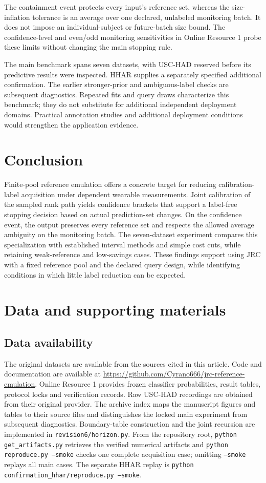 \documentclass[pdflatex,sn-basic,Numbered,iicol]{sn-jnl}
\begin{document}
The containment event protects every input's reference set, whereas the size-inflation tolerance is an average over one declared, unlabeled monitoring batch. It does not impose an individual-subject or future-batch size bound. The confidence-level and even/odd monitoring sensitivities in Online Resource 1 probe these limits without changing the main stopping rule.

The main benchmark spans seven datasets, with USC-HAD reserved before its predictive results were inspected. HHAR supplies a separately specified additional confirmation. The earlier stronger-prior and ambiguous-label checks are subsequent diagnostics. Repeated fits and query draws characterize this benchmark; they do not substitute for additional independent deployment domains. Practical annotation studies and additional deployment conditions would strengthen the application evidence.

\section{Conclusion}
Finite-pool reference emulation offers a concrete target for reducing calibration-label acquisition under dependent wearable measurements. Joint calibration of the sampled rank path yields confidence brackets that support a label-free stopping decision based on actual prediction-set changes. On the confidence event, the output preserves every reference set and respects the allowed average ambiguity on the monitoring batch. The seven-dataset experiment compares this specialization with established interval methods and simple cost cuts, while retaining weak-reference and low-savings cases. These findings support using JRC with a fixed reference pool and the declared query design, while identifying conditions in which little label reduction can be expected.


\backmatter
\section*{Data and supporting materials}
\subsection*{Data availability}
The original datasets are available from the sources cited in this article. Code and documentation are available at \url{https://github.com/Cyrano666/jrc-reference-emulation}. Online Resource 1 provides frozen classifier probabilities, result tables, protocol locks and verification records. Raw USC-HAD recordings are obtained from their original provider. The archive index maps the manuscript figures and tables to their source files and distinguishes the locked main experiment from subsequent diagnostics. Boundary-table construction and the joint recursion are implemented in \texttt{revision6/horizon.py}. From the repository root, \texttt{python get\_artifacts.py} retrieves the verified numerical artifacts and \texttt{python reproduce.py --smoke} checks one complete acquisition case; omitting \texttt{--smoke} replays all main cases. The separate HHAR replay is \texttt{python confirmation\_hhar/reproduce.py --smoke}.
\end{document}
